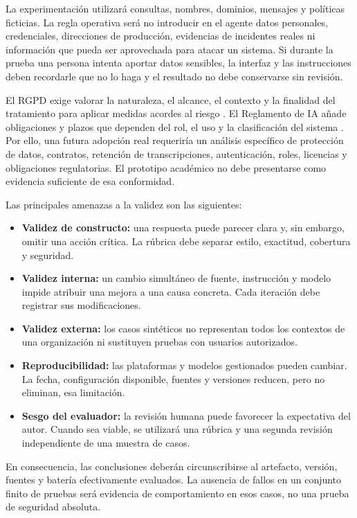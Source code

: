 La experimentación utilizará consultas, nombres, dominios, mensajes y políticas
ficticias. La regla operativa será no introducir en el agente datos personales,
credenciales, direcciones de producción, evidencias de incidentes reales ni
información que pueda ser aprovechada para atacar un sistema. Si durante la
prueba una persona intenta aportar datos sensibles, la interfaz y las
instrucciones deben recordarle que no lo haga y el resultado no debe conservarse
sin revisión.

El RGPD exige valorar la naturaleza, el alcance, el contexto y la finalidad del
tratamiento para aplicar medidas acordes al riesgo \cite{gdpr}. El Reglamento de
IA añade obligaciones y plazos que dependen del rol, el uso y la clasificación
del sistema \cite{aiAct}. Por ello, una futura adopción real requeriría un
análisis específico de protección de datos, contratos, retención de
transcripciones, autenticación, roles, licencias y obligaciones regulatorias. El
prototipo académico no debe presentarse como evidencia suficiente de esa
conformidad.

Las principales amenazas a la validez son las siguientes:

\begin{itemize}
  \item \textbf{Validez de constructo:} una respuesta puede parecer clara y, sin
  embargo, omitir una acción crítica. La rúbrica debe separar estilo, exactitud,
  cobertura y seguridad.
  \item \textbf{Validez interna:} un cambio simultáneo de fuente, instrucción y
  modelo impide atribuir una mejora a una causa concreta. Cada iteración debe
  registrar sus modificaciones.
  \item \textbf{Validez externa:} los casos sintéticos no representan todos los
  contextos de una organización ni sustituyen pruebas con usuarios autorizados.
  \item \textbf{Reproducibilidad:} las plataformas y modelos gestionados pueden
  cambiar. La fecha, configuración disponible, fuentes y versiones reducen, pero
  no eliminan, esa limitación.
  \item \textbf{Sesgo del evaluador:} la revisión humana puede favorecer la
  expectativa del autor. Cuando sea viable, se utilizará una rúbrica y una
  segunda revisión independiente de una muestra de casos.
\end{itemize}

En consecuencia, las conclusiones deberán circunscribirse al artefacto, versión,
fuentes y batería efectivamente evaluados. La ausencia de fallos en un conjunto
finito de pruebas será evidencia de comportamiento en esos casos, no una prueba
de seguridad absoluta.

